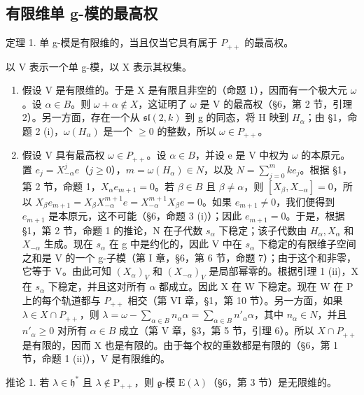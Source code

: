 \subsection{有限维单 g-模的最高权}

定理 1. 单 g-模是有限维的，当且仅当它具有属于 \(P_{++}\) 的最高权。

以 V 表示一个单 g-模，以 X 表示其权集。

\begin{enumerate}
\def\labelenumi{\alph{enumi})}
\item
  假设 V 是有限维的。于是 X 是有限且非空的（命题 1），因而有一个极大元 \(\omega\)。设 \(\alpha \in B\)。则 \(\omega + \alpha \notin X\)，这证明了 \(\omega\) 是 V 的最高权（§6，第 2 节，引理 2）。另一方面，存在一个从 \(\mathfrak{sl}(2, k)\) 到 g 的同态，将 H 映到 \(H_{\alpha}\)；由 §1，命题 2 (i)，\(\omega(H_{\alpha})\) 是一个 \(\geq 0\) 的整数，所以 \(\omega \in P_{++}\)。
\item
  假设 V 具有最高权 \(\omega\in P_{++}\)。设 \(\alpha\in B\)，并设 e 是 V 中权为 \(\omega\) 的本原元。置 \(e_{j}=X_{-\alpha}^{j}e\)（\(j\geq0\)），\(m=\omega(H_{\alpha})\in N\)，以及 \(N=\sum_{j=0}^{m}ke_{j}\)。根据 §1，第 2 节，命题 1，\(X_{\alpha}e_{m+1}=0\)。若 \(\beta\in B\) 且 \(\beta\neq\alpha\)，则 \([X_{\beta},X_{-\alpha}]=0\)，所以 \(X_{\beta}e_{m+1}=X_{\beta}X_{-\alpha}^{m+1}e=X_{-\alpha}^{m+1}X_{\beta}e=0\)。如果 \(e_{m+1}\neq0\)，我们便得到 \(e_{m+1}\) 是本原元，这不可能（§6，命题 3 (i)）；因此 \(e_{m+1}=0\)。于是，根据 §1，第 2 节，命题 1 的推论，N 在子代数 \(s_{\alpha}\) 下稳定；该子代数由 \(H_{\alpha},X_{\alpha}\) 和 \(X_{-\alpha}\) 生成。现在 \(s_{\alpha}\) 在 g 中是约化的，因此 V 中在 \(s_{\alpha}\) 下稳定的有限维子空间之和是 V 的一个 g-子模（第 I 章，§6，第 6 节，命题 7）；由于这个和非零，它等于 V。由此可知 \((X_{\alpha})_{V}\) 和 \((X_{-\alpha})_{V}\) 是局部幂零的。根据引理 1 (ii)，X 在 \(s_{\alpha}\) 下稳定，并且这对所有 \(\alpha\) 都成立。因此 X 在 W 下稳定。现在 W 在 P 上的每个轨道都与 \(P_{++}\) 相交（第 VI 章，§1，第 10 节）。另一方面，如果 \(\lambda\in X\cap P_{++}\)，则 \(\lambda=\omega-\sum_{\alpha\in B}n_{\alpha}\alpha=\sum_{\alpha\in B}n'_{\alpha}\alpha\)，其中 \(n_{\alpha}\in N\)，并且 \(n'_{\alpha}\geq0\) 对所有 \(\alpha\in B\) 成立（第 V 章，§3，第 5 节，引理 6）。所以 \(X\cap P_{++}\) 是有限的，因而 X 也是有限的。由于每个权的重数都是有限的（§6，第 1 节，命题 1 (ii)），V 是有限维的。
\end{enumerate}

推论 1. 若 \(\lambda \in \mathfrak{h}^*\) 且 \(\lambda \notin \mathrm{P}_{++}\)，则 \(\mathfrak{g}\)-模 \(\mathrm{E}(\lambda)\)（§6，第 3 节）是无限维的。

